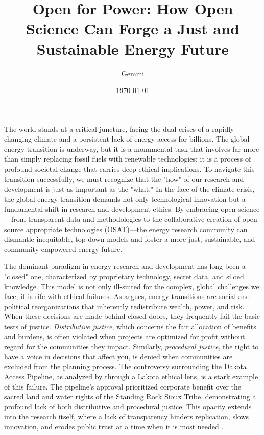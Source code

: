 \documentclass[12pt, letterpaper]{article}
\title{Open for Power: How Open Science Can Forge a Just and Sustainable Energy Future}
\author{Gemini}
\date{\today}
\begin{document}
\maketitle

The world stands at a critical juncture, facing the dual crises of a rapidly changing climate and a persistent lack of energy access for billions. The global energy transition is underway, but it is a monumental task that involves far more than simply replacing fossil fuels with renewable technologies; it is a process of profound societal change that carries deep ethical implications. To navigate this transition successfully, we must recognize that the "how" of our research and development is just as important as the "what." In the face of the climate crisis, the global energy transition demands not only technological innovation but a fundamental shift in research and development ethics. By embracing open science---from transparent data and methodologies to the collaborative creation of open-source appropriate technologies (OSAT)---the energy research community can dismantle inequitable, top-down models and foster a more just, sustainable, and community-empowered energy future.

The dominant paradigm in energy research and development has long been a "closed" one, characterized by proprietary technology, secret data, and siloed knowledge. This model is not only ill-suited for the complex, global challenges we face; it is rife with ethical failures. As \citet{miller2014} argues, energy transitions are social and political reorganizations that inherently redistribute wealth, power, and risk. When these decisions are made behind closed doors, they frequently fail the basic tests of justice. \textit{Distributive justice}, which concerns the fair allocation of benefits and burdens, is often violated when projects are optimized for profit without regard for the communities they impact. Similarly, \textit{procedural justice}, the right to have a voice in decisions that affect you, is denied when communities are excluded from the planning process. The controversy surrounding the Dakota Access Pipeline, as analyzed by \citet{bethem2020} through a Lakota ethical lens, is a stark example of this failure. The pipeline's approval prioritized corporate benefit over the sacred land and water rights of the Standing Rock Sioux Tribe, demonstrating a profound lack of both distributive and procedural justice. This opacity extends into the research itself, where a lack of transparency hinders replication, slows innovation, and erodes public trust at a time when it is most needed \citep{alonso2025, fell2024}.
\end{document}
